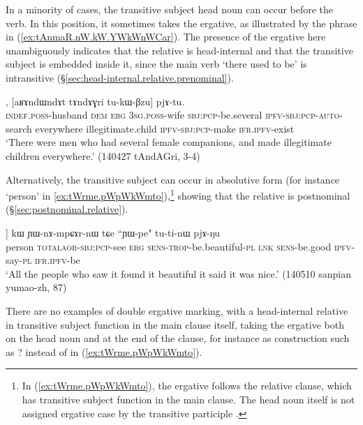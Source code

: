 In a minority of cases, the transitive subject head noun can occur before the verb. In this position, it sometimes takes the ergative, as illustrated by the phrase  in (\ref{ex:tAnmaR.nW.kW.YWkWnWCar}). The presence of the ergative here unambiguously indicates that the relative is head-internal and that the transitive subject is embedded inside it, since the main verb  `there used to be' is intransitive (§\ref{sec:head-internal.relative.prenominal}).
 
\begin{exe}
\ex \label{ex:tAnmaR.nW.kW.YWkWnWCar}
, [aʁɤndɯndɤt tɤndɤɣri tu-kɯ-βzu] pjɤ-tu. \\
\textsc{indef}.\textsc{poss}-husband \textsc{dem} \textsc{erg} \textsc{3sg}.\textsc{poss}-wife \textsc{sbj}:\textsc{pcp}-be.several \textsc{ipfv}-\textsc{sbj}:\textsc{pcp}-\textsc{auto}-search everywhere illegitimate.child \textsc{ipfv}-\textsc{sbj}:\textsc{pcp}-make \textsc{ifr}.\textsc{ipfv}-exist \\
\glt `There were men who had several female companions, and made illegitimate children everywhere.' (140427 tAndAGri, 3-4)
\end{exe} 

Alternatively, the transitive subject can occur in absolutive form (for instance  `person' in \ref{ex:tWrme.pWpWkWmto}),\footnote{In (\ref{ex:tWrme.pWpWkWmto}), the ergative  follows the relative clause, which has transitive subject function in the main clause. The head noun  itself is not assigned ergative case by the transitive participle . } showing that the relative is postnominal (§\ref{sec:postnominal.relative}).

\begin{exe}
\ex \label{ex:tWrme.pWpWkWmto}
\gll [\textbf{tɯrme} [pɯ\redp{}pɯ-kɯ-mto]] kɯ  ɲɯ-nɤ-mpɕɤr-nɯ tɕe ``ɲɯ-pe" tu-ti-nɯ pjɤ-ŋu \\
person \textsc{total}\redp{}\textsc{aor}-\textsc{sbj}:\textsc{pcp}-see \textsc{erg} \textsc{sens}-\textsc{trop}-be.beautiful-\textsc{pl} \textsc{lnk} \textsc{sens}-be.good \textsc{ipfv}-say-\textsc{pl} \textsc{ifr}.\textsc{ipfv}-be \\
\glt `All the people who saw it found it beautiful it said it was nice.' (140510 sanpian yumao-zh, 87)
\end{exe}

There are no examples of double ergative marking, with a head-internal relative  in transitive subject function in the main clause itself, taking the ergative both on the head noun and at the end of the clause, for instance as construction such as ? instead of  in (\ref{ex:tWrme.pWpWkWmto}).

